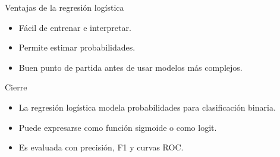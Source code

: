 \documentclass{beamer}
\begin{document}
\begin{frame}{Ventajas de la regresión logística}
\begin{itemize}
    \item Fácil de entrenar e interpretar.
    \item Permite estimar probabilidades.
    \item Buen punto de partida antes de usar modelos más complejos.
\end{itemize}
\end{frame}

\begin{frame}{Cierre}
\begin{itemize}
    \item La regresión logística modela probabilidades para clasificación binaria.
    \item Puede expresarse como función sigmoide o como logit.
    \item Es evaluada con precisión, F1 y curvas ROC.
\end{itemize}
\end{frame}
\end{document}
